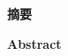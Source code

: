 \begin{center}
    \bfseries {} 摘要
\end{center}


\begin{center}
    \bfseries {} Abstract
\end{center}
